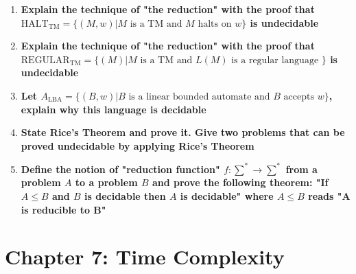 \documentclass{article}
\begin{document}
\begin{enumerate}{}
\item \textbf{Explain the technique of "the reduction" with the proof that $\text{HALT}_\text{TM} = \{(M, w) | M \text{ is a TM and } M \text{ halts on } w\}$ is undecidable}

\item \textbf{Explain the technique of "the reduction" with the proof that $\text{REGULAR}_\text{TM} = \{(M) | M \text{ is a TM and } L(M) \text{ is a regular language } \}$ is undecidable}

\item \textbf{Let $A_\text{LBA} = \{(B, w) | B \text{ is a linear bounded automate and } B \text{ accepts } w \}$, explain why this language is decidable}

\item \textbf{State Rice’s Theorem and prove it. Give two problems that can be proved
undecidable by applying Rice’s Theorem}

\item \textbf{Define the notion of "reduction function" $f : \sum^{*} \rightarrow \sum^{*}$ from a problem $A$ to a problem $B$ and prove the following theorem: "If $A \leq B$ and $B$ is decidable then $A$ is decidable" where $A \leq B$ reads "A is reducible to B"}

\end{enumerate}{}


\clearpage
\section{Chapter 7: Time Complexity}
\end{document}
